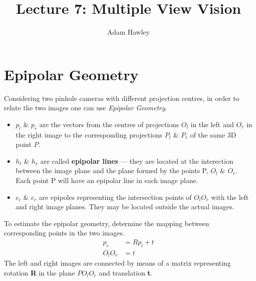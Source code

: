 \documentclass{article}
\author{Adam Hawley}
\title{Lecture 7: Multiple View Vision}
\begin{document}
\maketitle

\section{Epipolar Geometry}
Considering two pinhole cameras with different projection centres, in order to relate the two images one can use {\it Epipolar Geometry}.

\begin{itemize}
	\item $p_l$ \& $p_r$ are the vectors from the centres of projections $O_l$ in the left and $O_r$ in the right image to the corresponding projections $P_l$ \& $P_r$ of the same 3D point $P$.
	\item $h_l$ \& $h_r$ are called {\bf epipolar lines} --- they are located at the interection between the image plane and the plane formed by the points P, $O_l$ \& $O_r$.
		Each point P will have an epipolar line in each image plane.
	\item $e_i$ \& $e_r$ are epipoles representing the intersection points of $O_l O_r$ with the left and right image planes.
		They may be located outside the actual images.
\end{itemize}


To estimate the epipolar geometry, determine the mapping between corresponding points in the two images.
\begin{align*}
	p_r &= Rp_l + t \\
	O_lO_r &= t
\end{align*}
The left and right images are connected by means of a matrix representing rotation {\bf R} in the plane $PO_lO_r$ and translation {\bf t}.  
\end{document}
